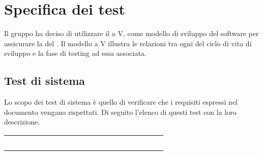 \appendix
\section{Specifica dei test}
\label{specificatest}
Il gruppo ha deciso di utilizzare il  a V, come modello di sviluppo del software per assicurare la  del .
Il modello a V illustra le relazioni tra ogni  del ciclo di vita di sviluppo e la fase di testing ad essa associata.
\subsection{Test di sistema}
Lo scopo dei test di sistema è quello di verificare che i requisiti espressi nel documento \AdR{} vengano rispettati. Di seguito l'elenco di questi test con la loro descrizione.
\begin{longtable}{|c| C{10cm} |C{3cm}|} 
	\textcolor{white}{\textbf{ID Test}}&
	\textcolor{white}{\textbf{Descrizione}}&
	\textcolor{white}{\textbf{Implementato}}\\	
	

\end{longtable}
